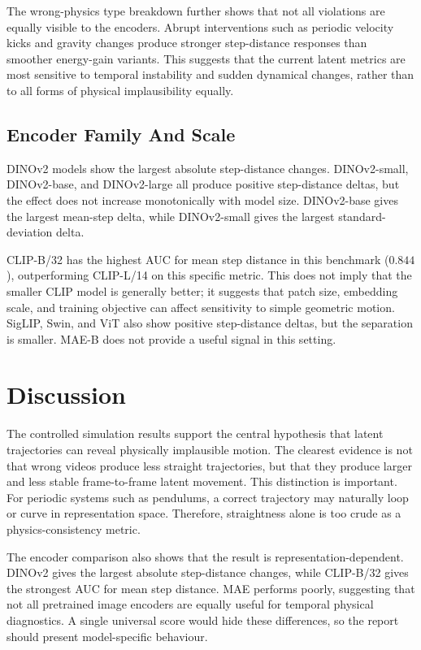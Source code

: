 \documentclass[final-report]{report-template}
\begin{document}
The wrong-physics type breakdown further shows that not all violations are
equally visible to the encoders. Abrupt interventions such as periodic velocity
kicks and gravity changes produce stronger step-distance responses than smoother
energy-gain variants. This suggests that the current latent metrics are most
sensitive to temporal instability and sudden dynamical changes, rather than to
all forms of physical implausibility equally.



\subsection{Encoder Family And Scale}
DINOv2 models show the largest absolute step-distance changes. DINOv2-small,
DINOv2-base, and DINOv2-large all produce positive step-distance deltas, but the
effect does not increase monotonically with model size. DINOv2-base gives the
largest mean-step delta, while DINOv2-small gives the largest standard-deviation
delta.

CLIP-B/32 has the highest AUC for mean step distance in this benchmark
($0.844$), outperforming CLIP-L/14 on this specific metric. This does not imply
that the smaller CLIP model is generally better; it suggests that patch size,
embedding scale, and training objective can affect sensitivity to simple
geometric motion. SigLIP, Swin, and ViT also show positive step-distance deltas,
but the separation is smaller. MAE-B does not provide a useful signal in this
setting.

\section{Discussion}
The controlled simulation results support the central hypothesis that latent
trajectories can reveal physically implausible motion. The clearest evidence is
not that wrong videos produce less straight trajectories, but that they produce
larger and less stable frame-to-frame latent movement. This distinction is
important. For periodic systems such as pendulums, a correct trajectory may
naturally loop or curve in representation space. Therefore, straightness alone
is too crude as a physics-consistency metric.

The encoder comparison also shows that the result is representation-dependent.
DINOv2 gives the largest absolute step-distance changes, while CLIP-B/32 gives
the strongest AUC for mean step distance. MAE performs poorly, suggesting that
not all pretrained image encoders are equally useful for temporal physical
diagnostics. A single universal score would hide these differences, so the
report should present model-specific behaviour.
\end{document}
